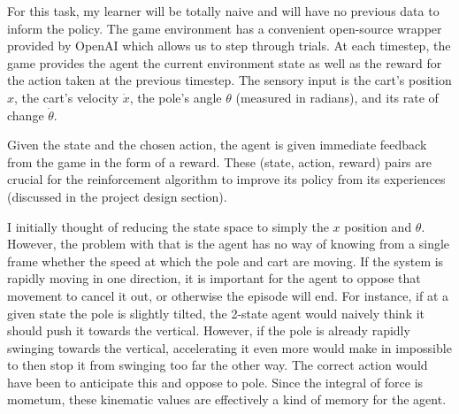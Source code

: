 \documentclass[12pt,a4paper]{article}
\begin{document}
For this task, my learner will be totally naive and will have no previous data to inform the policy. The game environment has a convenient open-source wrapper provided by OpenAI which allows us to step through trials.\cite{cartpole} At each timestep, the game provides the agent the current environment state as well as the reward for the action taken at the previous timestep.  The sensory input is the cart's position $x$, the cart's velocity $\dot x$, the pole's angle $\theta$ (measured in radians), and its rate of change $\dot\theta$.\cite{state_def} 

Given the state and the chosen action, the agent is given immediate feedback from the game in the form of a reward. These (state, action, reward) pairs are crucial for the reinforcement algorithm to improve its policy from its experiences (discussed in the project design section).

I initially thought of reducing the state space to simply the $x$ position and $\theta$. However, the problem with that is the agent has no way of knowing from a single frame whether the speed at which the pole and cart are moving. If the system is rapidly moving in one direction, it is important for the agent to oppose that movement to cancel it out, or otherwise the episode will end. For instance, if at a given state the pole is slightly tilted, the 2-state agent would naively think it should push it towards the vertical. However, if the pole is already rapidly swinging towards the vertical, accelerating it even more would make in impossible to then stop it from swinging too far the other way. The correct action would have been to anticipate this and oppose to pole. Since the integral of force is mometum, these kinematic values are effectively a kind of memory for the agent. 



%
\end{document}
